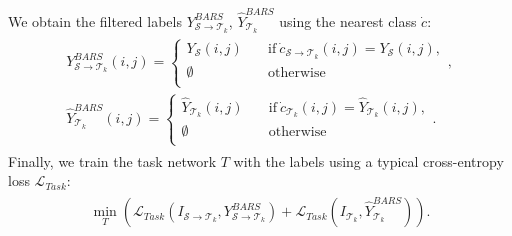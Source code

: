 We obtain the filtered labels $Y_{\mathcal{S}\to{\mathcal{T}_k}}^{BARS}$, $\hat{Y}_{\mathcal{T}_k}^{BARS}$ using the nearest class $\dot{c}$:
\begin{gather}
\begin{split}
Y_{\mathcal{S}\to{\mathcal{T}_k}}^{BARS}(i, j) = 
\begin{cases}
Y_\mathcal{S}(i, j) & \quad \text{if}~\dot{c}_{\mathcal{S}\to \mathcal{T}_k}(i,j)=Y_\mathcal{S}(i, j),\\
\emptyset & \quad \text{otherwise}\\
\end{cases},
\\
\hat{Y}_{\mathcal{T}_k}^{BARS}(i, j) = 
\begin{cases}
\hat{Y}_{\mathcal{T}_k}(i, j) & \quad \text{if}~\dot{c}_{\mathcal{T}_k}(i,j)=\hat{Y}_{\mathcal{T}_k}(i, j),\\
\emptyset & \quad \text{otherwise}\\
\end{cases}.
\end{split}
\end{gather}
Finally, we train the task network $T$ with the labels using a typical cross-entropy loss $\mathcal{L}_{Task}$:
\setlength{}
\begin{gather}
\begin{split}
\min_{T} \left( \mathcal{L}_{Task} (I_{\mathcal{S} \to \mathcal{T}_k}, 
Y_{\mathcal{S}\to{\mathcal{T}_k}}^{BARS}) + \mathcal{L}_{Task} (I_{\mathcal{T}_k}, \hat{Y}_{\mathcal{T}_k}^{BARS}) \right).
\end{split}
\end{gather}

